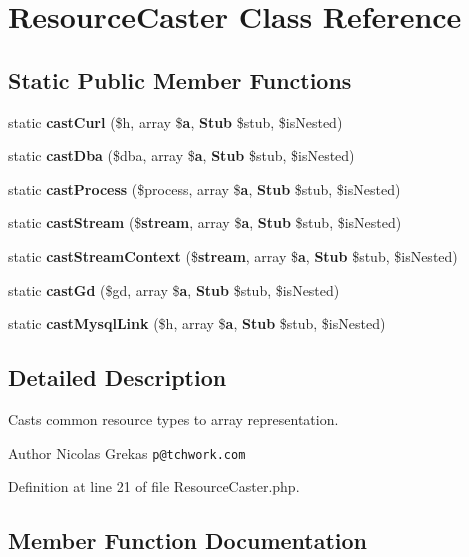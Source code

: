 \section{Resource\+Caster Class Reference}
\label{class_symfony_1_1_component_1_1_var_dumper_1_1_caster_1_1_resource_caster}
\subsection*{Static Public Member Functions}
\begin{DoxyCompactItemize}
\item 
static {\bf cast\+Curl} (\$h, array \${\bf a}, {\bf Stub} \$stub, \$is\+Nested)
\item 
static {\bf cast\+Dba} (\$dba, array \${\bf a}, {\bf Stub} \$stub, \$is\+Nested)
\item 
static {\bf cast\+Process} (\$process, array \${\bf a}, {\bf Stub} \$stub, \$is\+Nested)
\item 
static {\bf cast\+Stream} (\${\bf stream}, array \${\bf a}, {\bf Stub} \$stub, \$is\+Nested)
\item 
static {\bf cast\+Stream\+Context} (\${\bf stream}, array \${\bf a}, {\bf Stub} \$stub, \$is\+Nested)
\item 
static {\bf cast\+Gd} (\$gd, array \${\bf a}, {\bf Stub} \$stub, \$is\+Nested)
\item 
static {\bf cast\+Mysql\+Link} (\$h, array \${\bf a}, {\bf Stub} \$stub, \$is\+Nested)
\end{DoxyCompactItemize}


\subsection{Detailed Description}
Casts common resource types to array representation.

\begin{DoxyAuthor}{Author}
Nicolas Grekas {\tt p@tchwork.\+com} 
\end{DoxyAuthor}


Definition at line 21 of file Resource\+Caster.\+php.



\subsection{Member Function Documentation}
